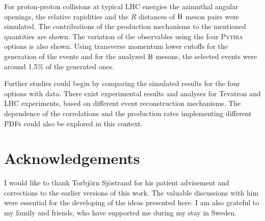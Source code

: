 \documentclass[a4paper,12pt]{article}
\begin{document}
For proton-proton collisions at typical LHC energies the azimuthal angular openings, the relative rapidities and the $R$ distances of ${\mathrm B}$ meson pairs were simulated. The contributions of the production mechanisms to the mentioned quantities are shown. The variation of the observables using the four \textsc{Pythia} options is also shown. Using transverse momentum lower cutoffs for the generation of the events and for the analyzed ${\mathrm B}$ mesons, the selected events were around 1.5\% of the generated ones.

Further studies could begin by comparing the simulated results for the four options with data. There exist experimental results and analyses for Tevatron and LHC experiments, based on different event reconstruction mechanisms. The dependence of the correlations and the production rates implementing different PDFs could also be explored in this context. 

\section*{Acknowledgements}

I would like to thank Torbjörn Sjöstrand for his patient advisement and corrections to the earlier versions of this work. The valuable discussions with him were essential for the developing of the ideas presented here. I am also grateful to my family and friends, who have supported me during my stay in Sweden.
\end{document}
